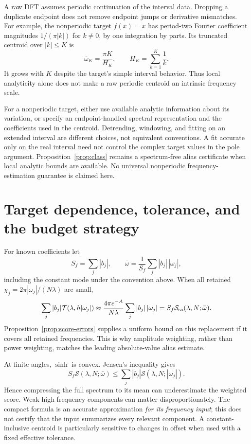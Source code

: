 \documentclass[11pt]{article}
\theoremstyle{definition}\newtheorem{definition}[theorem]{Definition}
\theoremstyle{remark}\newtheorem{remark}[theorem]{Remark}
\numberwithin{equation}{section}
\newcommand{\T}{\mathcal T}
\newcommand{\Sscore}{\mathcal S}
\newcommand{\Sa}{\mathcal S_{\rm sa}}
\begin{document}
A raw DFT assumes periodic continuation of the interval data. Dropping a duplicate endpoint does not remove endpoint jumps or derivative mismatches. For example, the nonperiodic target $f(x)=x$ has period-two Fourier coefficient magnitudes $1/(\pi|k|)$ for $k\ne0$, by one integration by parts. Its truncated centroid over $|k|\le K$ is
\begin{equation}
 \bar\omega_K=\frac{\pi K}{H_K},\qquad H_K=\sum_{k=1}^K\frac1k.
 \label{eq:ramp}
\end{equation}
It grows with $K$ despite the target's simple interval behavior. Thus local analyticity alone does not make a raw periodic centroid an intrinsic frequency scale.

For a nonperiodic target, either use available analytic information about its variation, or specify an endpoint-handled spectral representation and the coefficients used in the centroid. Detrending, windowing, and fitting on an extended interval are different choices, not equivalent conventions. A fit accurate only on the real interval need not control the complex target values in the pole argument. Proposition~\ref{prop:class} remains a spectrum-free alias certificate when local analytic bounds are available. No universal nonperiodic frequency-estimation guarantee is claimed here.

\section{Target dependence, tolerance, and the budget strategy}
\label{sec:budget}
For known coefficients let
\[
 S_f=\sum_j|b_j|,\qquad
 \bar\omega=\frac1{S_f}\sum_j|b_j|\,|\omega_j|,
\]
including the constant mode under the convention above. When all retained $\chi_j=2\pi|\omega_j|/(N\lambda)$ are small,
\begin{equation}
 \sum_j|b_j|\T(\lambda,h|\omega_j|)
 \approx\frac{4\pi e^{-A}}{N\lambda}\sum_j|b_j|\,|\omega_j|
 =S_f\Sa(\lambda,N;\bar\omega).
 \label{eq:mean-justification}
\end{equation}
Proposition~\ref{prop:score-errors} supplies a uniform bound on this replacement if it covers all retained frequencies. This is why amplitude weighting, rather than power weighting, matches the leading absolute-value alias estimate.

At finite angles, $\sinh$ is convex. Jensen's inequality gives
\begin{equation}
 \boxed{S_f\Sscore(\lambda,N;\bar\omega)
 \le\sum_j|b_j|\Sscore(\lambda,N;|\omega_j|).}
 \label{eq:jensen}
\end{equation}
Hence compressing the full spectrum to its mean can underestimate the weighted score. Weak high-frequency components can matter disproportionately. The compact formula is an accurate approximation \emph{for its frequency input}; this does not certify that the input summarizes every relevant component. A constant-inclusive centroid is particularly sensitive to changes in offset when used with a fixed effective tolerance.
\end{document}
